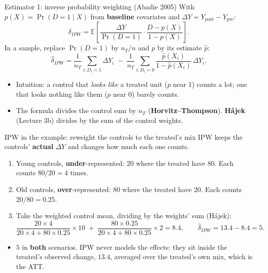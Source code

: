 \documentclass[
  11pt,
  ignorenonframetext,
  aspectratio=169,
]{beamer}
\providecommand{\tightlist}{%
  \setlength{\itemsep}{0pt}\setlength{\parskip}{0pt}}
\begin{document}
\begin{frame}{Estimator 1: inverse probability weighting (Abadie 2005)}
\protect{}\label{estimator-1-inverse-probability-weighting-abadie-2005}
With \(p(X) = \Pr(D=1 \mid X)\) from \textbf{baseline} covariates and
\(\Delta Y = Y_{\text{post}} - Y_{\text{pre}}\): \[
\delta_{IPW} = \mathbb{E}\!\left[\frac{\Delta Y}{\Pr(D=1)} \cdot \frac{D - p(X)}{1 - p(X)}\right].
\] In a sample, replace \(\Pr(D=1)\) by \(n_T/n\) and \(p\) by its
estimate \(\hat p\): \[
\hat\delta_{IPW} = \frac{1}{n_T}\sum_{i: D_i = 1} \Delta Y_i \;-\; \frac{1}{n_T}\sum_{i: D_i = 0} \frac{\hat p(X_i)}{1 - \hat p(X_i)}\, \Delta Y_i .
\]

\begin{itemize}
\tightlist
\item
  Intuition: a control that \emph{looks like} a treated unit (\(p\) near
  1) counts a lot; one that looks nothing like them (\(p\) near 0)
  barely counts.
\item
  The formula divides the control sum by \(n_T\)
  (\textbf{Horvitz--Thompson}). \textbf{Hájek} (Lecture 3b) divides by
  the sum of the control weights.
\end{itemize}
\end{frame}

\begin{frame}{IPW in the example: reweight the controls to the treated's
mix}
\protect{}\label{ipw-in-the-example-reweight-the-controls-to-the-treateds-mix}
IPW keeps the controls' \textbf{actual} \(\Delta Y\) and changes how
much each one counts.

\begin{enumerate}
\tightlist
\item
  Young controls, \textbf{under}-represented: \(20\) where the treated
  have \(80\). Each counts \(80/20 = 4\) times.
\item
  Old controls, \textbf{over}-represented: \(80\) where the treated have
  \(20\). Each counts \(20/80 = 0.25\).
\item
  Take the weighted control mean, dividing by the weights' sum (Hájek):
  \[
  \frac{20 \times 4}{20 \times 4 + 80 \times 0.25} \times 10 \;+\; \frac{80 \times 0.25}{20 \times 4 + 80 \times 0.25} \times 2 = 8.4, \qquad \hat\delta_{IPW} = 13.4 - 8.4 = 5.
  \]
\end{enumerate}

\begin{itemize}
\tightlist
\item
  \(5\) in \textbf{both} scenarios. IPW never models the effects: they
  sit inside the treated's observed change, \(13.4\), averaged over the
  treated's own mix, which is the ATT.
\end{itemize}
\end{frame}
\end{document}
